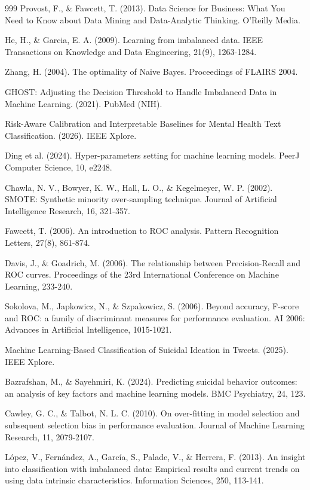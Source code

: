\begin{thebibliography}{999}
 Provost, F., \& Fawcett, T. (2013). Data Science for Business: What You Need to Know about Data Mining and Data-Analytic Thinking. O'Reilly Media.

 He, H., \& Garcia, E. A. (2009). Learning from imbalanced data. IEEE Transactions on Knowledge and Data Engineering, 21(9), 1263-1284.

 Zhang, H. (2004). The optimality of Naive Bayes. Proceedings of FLAIRS 2004.

 GHOST: Adjusting the Decision Threshold to Handle Imbalanced Data in Machine Learning. (2021). PubMed (NIH).

 Risk-Aware Calibration and Interpretable Baselines for Mental Health Text Classification. (2026). IEEE Xplore.

 Ding et al. (2024). Hyper-parameters setting for machine learning models. PeerJ Computer Science, 10, e2248.

 Chawla, N. V., Bowyer, K. W., Hall, L. O., \& Kegelmeyer, W. P. (2002). SMOTE: Synthetic minority over-sampling technique. Journal of Artificial Intelligence Research, 16, 321-357.

 Fawcett, T. (2006). An introduction to ROC analysis. Pattern Recognition Letters, 27(8), 861-874.

 Davis, J., \& Goadrich, M. (2006). The relationship between Precision-Recall and ROC curves. Proceedings of the 23rd International Conference on Machine Learning, 233-240.

 Sokolova, M., Japkowicz, N., \& Szpakowicz, S. (2006). Beyond accuracy, F-score and ROC: a family of discriminant measures for performance evaluation. AI 2006: Advances in Artificial Intelligence, 1015-1021.

 Machine Learning-Based Classification of Suicidal Ideation in Tweets. (2025). IEEE Xplore.

 Bazrafshan, M., \& Sayehmiri, K. (2024). Predicting suicidal behavior outcomes: an analysis of key factors and machine learning models. BMC Psychiatry, 24, 123.

 Cawley, G. C., \& Talbot, N. L. C. (2010). On over-fitting in model selection and subsequent selection bias in performance evaluation. Journal of Machine Learning Research, 11, 2079-2107.

 López, V., Fernández, A., García, S., Palade, V., \& Herrera, F. (2013). An insight into classification with imbalanced data: Empirical results and current trends on using data intrinsic characteristics. Information Sciences, 250, 113-141.


\end{thebibliography}
